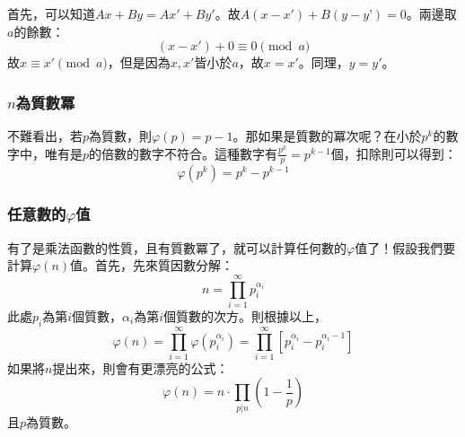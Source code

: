 		首先，可以知道$Ax + By = Ax' + By'$。故$A(x - x') + B(y- y’) = 0$。兩邊取$a$的餘數：
		\begin{equation*}
			(x - x') + 0 \equiv 0 \pmod a
		\end{equation*}
		故$x \equiv x' \pmod a$，但是因為$x, x'$皆小於$a$，故$x = x'$。同理，$y = y'$。
	\subsubsection{$n$為質數冪}
		不難看出，若$p$為質數，則$\varphi(p) = p - 1$。那如果是質數的冪次呢？在小於$p^k$的數字中，唯有是$p$的倍數的數字不符合。這種數字有$\frac{p^k}{p} = p^{k - 1}$個，扣除則可以得到：
		\begin{equation*}
			\varphi(p^k) = p^k - p^{k - 1}
		\end{equation*}
	\subsubsection{任意數的$\varphi$值}
		有了是乘法函數的性質，且有質數冪了，就可以計算任何數的$\varphi$值了！假設我們要計算$\varphi(n)$值。首先，先來質因數分解：
		\begin{equation*}
			n = \prod_{i = 1}^{\infty} p_i^{\alpha_i}
		\end{equation*}
		此處$p_i$為第$i$個質數，$\alpha_i$為第$i$個質數的次方。則根據以上，
		\begin{equation*}
		\varphi(n) = \prod_{i = 1}^{\infty} \varphi(p_i^{\alpha_i}) = \prod_{i = 1}^{\infty} \left[p_i^{\alpha_i} - p_i^{\alpha_i - 1}\right]
		\end{equation*}
		如果將$n$提出來，則會有更漂亮的公式：
		\begin{equation*}
			\varphi(n) = n \cdot \prod_{p | n} (1 - \frac{1}{p})
		\end{equation*}
		且$p$為質數。
		